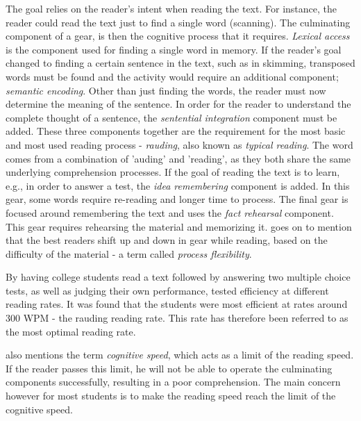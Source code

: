 The goal relies on the reader's intent when reading the text. For instance, the reader could read the text just to find a single word (scanning). The culminating component of a gear, is then the cognitive process that it requires. \textit{Lexical access} is the component used for finding a single word in memory. If the reader's goal changed to finding a certain sentence in the text, such as in skimming, transposed words must be found and the activity would require an additional component; \textit{semantic encoding}. Other than just finding the words, the reader must now determine the meaning of the sentence. In order for the reader to understand the complete thought of a sentence, the \textit{sentential integration} component must be added. These three components together are the requirement for the most basic and most used reading process - \textit{rauding}, also known as \textit{typical reading}. The word comes from a combination of 'auding' and 'reading', as they both share the same underlying comprehension processes. If the goal of reading the text is to learn, e.g., in order to answer a test, the \textit{idea remembering} component is added. In this gear, some words require re-reading and longer time to process. The final gear is focused around remembering the text and uses the \textit{fact rehearsal} component. This gear requires rehearsing the material and memorizing it. 
 goes on to mention that the best readers shift up and down in gear while reading, based on the difficulty of the material - a term called \textit{process flexibility}. 

By having college students read a text followed by answering two multiple choice tests, as well as judging their own performance, \citeauthor{carver_reading_1992} tested efficiency at different reading rates. It was found that the students were most efficient at rates around 300 WPM - the rauding reading rate. This rate has therefore been referred to as the most optimal reading rate.

\citeauthor{carver_reading_1992} also mentions the term \textit{cognitive speed}, which acts as a limit of the reading speed. If the reader passes this limit, he will not be able to operate the culminating components successfully, resulting in a poor comprehension. The main concern however for most students is to make the reading speed reach the limit of the cognitive speed.

